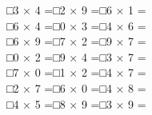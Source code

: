 \documentclass[uplatex,
paper=a4,
fontsize=18pt,
jafontsize=16pt,
number_of_lines=30,
line_length=30zh,
baselineskip=25pt,
]{jlreq}
\begin{document}
□\hspace{1em}3 × 4 =\hspace{3em}□\hspace{1em}2 × 9 =\hspace{3em}□\hspace{1em}6 × 1 =\hspace{3em}
\\

□\hspace{1em}6 × 4 =\hspace{3em}□\hspace{1em}0 × 3 =\hspace{3em}□\hspace{1em}4 × 6 =\hspace{3em}
\\

□\hspace{1em}6 × 9 =\hspace{3em}□\hspace{1em}7 × 2 =\hspace{3em}□\hspace{1em}9 × 7 =\hspace{3em}
\\

□\hspace{1em}0 × 2 =\hspace{3em}□\hspace{1em}9 × 4 =\hspace{3em}□\hspace{1em}3 × 7 =\hspace{3em}
\\

□\hspace{1em}7 × 0 =\hspace{3em}□\hspace{1em}1 × 2 =\hspace{3em}□\hspace{1em}4 × 7 =\hspace{3em}
\\

□\hspace{1em}2 × 7 =\hspace{3em}□\hspace{1em}6 × 0 =\hspace{3em}□\hspace{1em}4 × 8 =\hspace{3em}
\\

□\hspace{1em}4 × 5 =\hspace{3em}□\hspace{1em}8 × 9 =\hspace{3em}□\hspace{1em}3 × 9 =\hspace{3em}
\\
\end{document}
